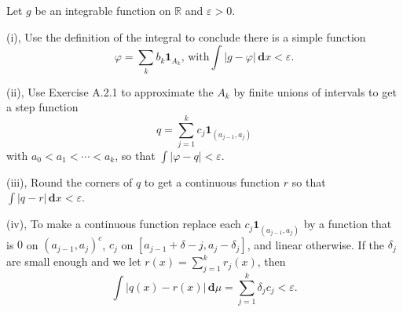 \documentclass[en, normal, 11pt, black]{elegantnote}
\newenvironment{exercise}[1]{\begin{tcolorbox}[colback=black!15, colframe=black!80, breakable, title=#1]}{\end{tcolorbox}}
\newcommand{\der}{\,\mathbf{d}}
\begin{document}

        
        

    \begin{exercise}{1.4.3}
        Let $g$ be an integrable function on $\mathbb{R}$ and $\varepsilon>0$. 
        
        (i), Use the definition of the integral to conclude there is a simple function 
        \[
            \varphi=\sum_{k} b_{k} \mathbf{1}_{A_{k}},\,\text{with}\int|g-\varphi| \der x<\varepsilon. 
        \]
        
        (ii), Use Exercise A.2.1 to approximate the $A_{k}$ by finite unions of intervals to get a step function 
        \[
            q=\sum_{j=1}^{k} c_{j} \mathbf{1}_{\left(a_{j-1}, a_{j}\right)}
        \]
        with $a_{0}<a_{1}<\cdots<a_{k}$, so that $\int|\varphi-q|<\varepsilon$. 
        
        (iii), Round the corners of $q$ to get a continuous function $r$ so that $\int|q-r| \der x<\varepsilon$. 


        (iv), To make a continuous function replace each $c_{j} \mathbf{1}_{\left(a_{j-1}, a_{j}\right)}$ by a function that is $0$ on $\left(a_{j-1}, a_{j}\right)^{c}$, $c_{j}$ on $\left[a_{j-1}+\delta-j, a_{j}-\delta_{j}\right]$, and linear otherwise. If the $\delta_{j}$ are small enough and we let $r(x)=\sum_{j=1}^{k} r_{j}(x)$, then
        \[
            \int|q(x)-r(x)| \der \mu=\sum_{j=1}^{k} \delta_{j} c_{j}<\varepsilon. 
        \]
    \end{exercise}
\end{document}
